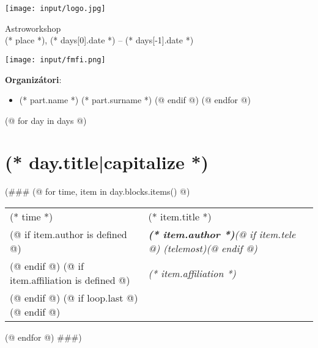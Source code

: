 \documentclass[a4paper]{report}
\begin{document}
    \begin{minipage}{\textwidth}
        \begin{minipage}{0.2\textwidth}
            \texttt{[image: input/logo.jpg]}
        \end{minipage}
        \begin{minipage}{0.58\textwidth}
            \centering
            \fontsize{40}{50}\selectfont
            Astroworkshop\\
            \Large
            (* place *), (* days[0].date *) -- (* days[-1].date *)
        \end{minipage}
        \begin{minipage}{0.2\textwidth}
            \texttt{[image: input/fmfi.png]}
        \end{minipage}
    \end{minipage}
    \vspace*{10mm}

    \textbf{Organizátori}:
    \begin{itemize}[itemsep=-2mm]
    (@ for part in participants @)
        (@ if part.org @)
            \item (* part.name *) (* part.surname *)
        (@ endif @)
    (@ endfor @)
    \end{itemize}

    (@ for day in days @)
        \section{(* day.title|capitalize *)}
(###
        (@ for time, item in day.blocks.items() @)
            \begin{tabularx}{\textwidth}{>{}p{2cm} >{\RaggedRight}X}
                \midrule
                {\Large (* time *)} & {\Large (* item.title *)} \\
                    (@ if item.author is defined @)
                        & \textit{\textbf{(* item.author *)}(@ if item.tele @) (telemost)(@ endif @)} \\
                    (@ endif @)
                    (@ if item.affiliation is defined @)
                        & \textit{(* item.affiliation *)} \\
                    (@ endif @)
                    (@ if loop.last @)\midrule(@ endif @)
            \end{tabularx}
        (@ endfor @)
###)
\end{document}
